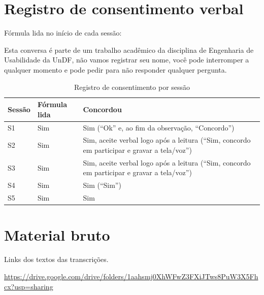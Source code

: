 \documentclass[
  12pt,
  oneside,
  a4paper,
  chapter=TITLE,
  section=TITLE,
  english,
  brazilian
]{abntex2}
\renewcommand{\fonte}[1]{\par\vspace{3pt}{\footnotesize\raggedright\noindent Fonte: #1\par}\vspace{4pt}}%
\begin{document}
\begin{apendicesenv}
\chapter{Registro de consentimento verbal}\label{ap:consentimento}

Fórmula lida no início de cada sessão:

\begin{citacao}
Esta conversa é parte de um trabalho acadêmico da disciplina de Engenharia de
Usabilidade da UnDF, não vamos registrar seu nome, você pode interromper a
qualquer momento e pode pedir para não responder qualquer pergunta.
\end{citacao}

\begin{table}[!htbp]
  \caption{Registro de consentimento por sessão}\label{tab:consentimento}
  \centering\footnotesize
  \begin{tabularx}{\textwidth}{|P{1.4cm}|P{2.4cm}|Y|}\hline
    Sessão & Fórmula lida & Concordou \\\hline
    S1 & Sim & Sim (``Ok'' e, ao fim da observação, ``Concordo'') \\\hline
    S2 & Sim & Sim, aceite verbal logo após a leitura (``Sim, concordo em participar e gravar a tela/voz'') \\\hline
    S3 & Sim & Sim, aceite verbal logo após a leitura (``Sim, concordo em participar e gravar a tela/voz'') \\\hline
    S4 & Sim & Sim (``Sim'') \\\hline
    S5 & Sim & Sim \\\hline
  \end{tabularx}
  \fonte{Elaborada pelos autores (2026).}
\end{table}

\chapter{Material bruto}\label{ap:material}

Links dos textos das transcrições.

\url{https://drive.google.com/drive/folders/1aahsmj0XhWFwZ3FXiJTws8PuW3X5Fhcx?usp=sharing}


\end{apendicesenv}
\end{document}
